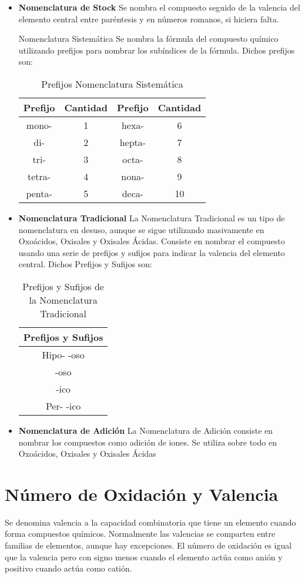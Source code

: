 \begin{itemize}
	\item \textbf{Nomenclatura de Stock} Se nombra el compuesto seguido de la valencia del elemento central entre paréntesis y en números romanos, si hiciera falta.
	\item[Nomenclatura Sistemática] Se nombra la fórmula del compuesto químico utilizando prefijos para nombrar los subíndices de la fórmula. Dichos prefijos son:\\
	\begin{table}[h!]
		\centering
		\label{tab:nomsist}
		\begin{tabular}{c c|c c}
			Prefijo&Cantidad&Prefijo&Cantidad\\ \hline
			mono-&1&hexa-&6\\ 
			di-&2&hepta-&7\\ 
			tri-&3&octa-&8\\ 
			tetra-&4&nona-&9\\
			penta-&5&deca-&10\\ \hline
		\end{tabular}
		\caption{Prefijos Nomenclatura Sistemática}
	\end{table}
	\item\textbf{Nomenclatura Tradicional} La Nomenclatura Tradicional es un tipo de nomenclatura en desuso, aunque se sigue utilizando masivamente en Oxoácidos, Oxisales y Oxisales Ácidas. Consiste en nombrar el compuesto usando una serie de prefijos y sufijos para indicar la valencia del elemento central. Dichos Prefijos y Sufijos son:
	\begin{table}[h!]
		\centering
		\label{tab:nomtrad}
		\begin{tabular}{c}
			Prefijos y Sufijos\\ \hline
			Hipo- -oso\\
			-oso\\
			-ico\\
			Per- -ico\\ \hline
		\end{tabular}
	\caption{Prefijos y Sufijos de la Nomenclatura Tradicional}
	\end{table}
	\item\textbf{Nomenclatura de Adición} La Nomenclatura de Adición consiste en nombrar los compuestos como adición de iones. Se utiliza sobre todo en Oxoácidos, Oxisales y Oxisales Ácidas
\end{itemize}

\section{Número de Oxidación y Valencia}
	Se denomina valencia a la capacidad combinatoria que tiene un elemento cuando forma compuestos químicos. Normalmente las valencias se comparten entre familias de elementos, aunque  hay excepciones. El número de oxidación es igual que la valencia pero con signo menos cuando el elemento actúa como anión y positivo cuando actúa como catión.
	
